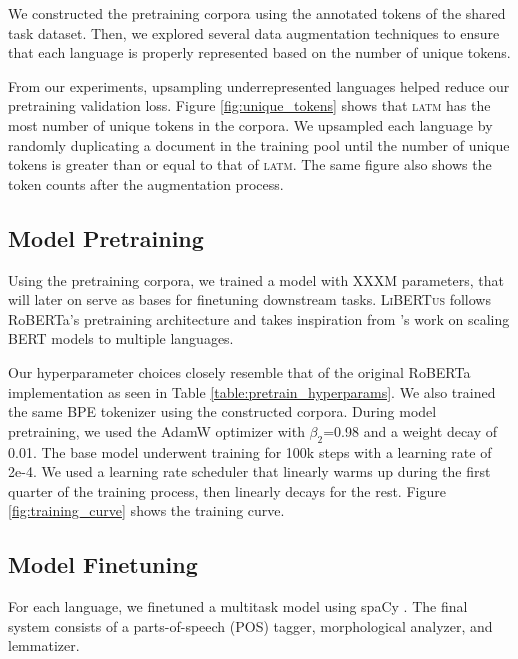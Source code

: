 \documentclass[11pt]{article}
\newcommand{\libertus}{\textsc{LiBERTus}}
\begin{document}
We constructed the pretraining corpora using the annotated tokens of the shared task dataset.
Then, we explored several data augmentation techniques to ensure that each language is properly represented based on the number of unique tokens.

From our experiments, upsampling underrepresented languages helped reduce our pretraining validation loss.
Figure \ref{fig:unique_tokens} shows that \textsc{latm} has the most number of unique tokens in the corpora.
We upsampled each language by randomly duplicating a document in the training pool until the number of unique tokens is greater than or equal to that of \textsc{latm}.
The same figure also shows the token counts after the augmentation process.

\subsection{Model Pretraining}

Using the pretraining corpora, we trained a model with XXXM parameters, that will later on serve as bases for finetuning downstream tasks.
\libertus{} follows RoBERTa's pretraining architecture \cite{liu-etal-2019-roberta} and takes inspiration from \citet{conneau-etal-2020-unsupervised}'s work on scaling BERT models to multiple languages.



Our hyperparameter choices closely resemble that of the original RoBERTa implementation as seen in Table \ref{table:pretrain_hyperparams}.
We also trained the same BPE tokenizer \citep{sennrich-etal-2016-neural} using the constructed corpora.
During model pretraining, we used the AdamW optimizer with $\beta_2$=0.98 and a weight decay of 0.01.
The base model underwent training for 100k steps with a learning rate of 2e-4.
We used a learning rate scheduler that linearly warms up during the first quarter of the training process, then linearly decays for the rest.
Figure \ref{fig:training_curve} shows the training curve.

\subsection{Model Finetuning}

For each language, we finetuned a multitask model using spaCy \cite{honnibal-etal-2020-spacy}. 
The final system consists of a parts-of-speech (POS) tagger, morphological analyzer, and lemmatizer.
\end{document}
